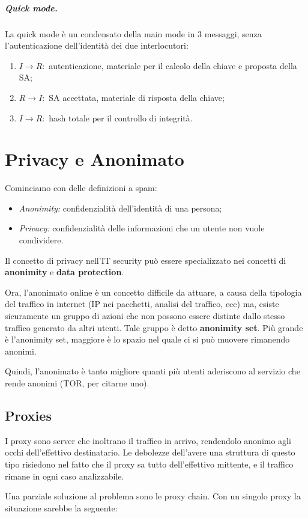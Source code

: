 \documentclass[a4paper, 10pt, twoside]{article}
\begin{document}
	\subparagraph{Quick mode.} La quick mode è un condensato della main mode in 3 messaggi, senza l'autenticazione dell'identità dei due interlocutori:\begin{enumerate}
		\item $I \to R:$ autenticazione, materiale per il calcolo della chiave e proposta della SA;
		\item $R \to I:$ SA accettata, materiale di risposta della chiave;
		\item $I \to R:$ hash totale per il controllo di integrità.
	\end{enumerate}

	\section{Privacy e Anonimato}
	Cominciamo con delle definizioni a spam: \begin{itemize}
		\item \textit{Anonimity:} confidenzialità dell'identità di una persona;
		\item \textit{Privacy:} confidenzialità delle informazioni che un utente non vuole condividere.
	\end{itemize}

	Il concetto di privacy nell'IT security può essere specializzato nei concetti di \textbf{anonimity} e \textbf{data protection}.

	Ora, l'anonimato online è un concetto difficile da attuare, a causa della tipologia del traffico in internet (IP nei pacchetti, analisi del traffico, ecc) ma, esiste sicuramente un gruppo di azioni che non possono essere distinte dallo stesso traffico generato da altri utenti. Tale gruppo è detto \textbf{anonimity set}. Più grande è l'anonimity set, maggiore è lo spazio nel quale ci si può muovere rimanendo anonimi.

	Quindi, l'anonimato è tanto migliore quanti più utenti aderiscono al servizio che rende anonimi (TOR, per citarne uno).

	\subsection{Proxies}
	I proxy sono server che inoltrano il traffico in arrivo, rendendolo anonimo agli occhi dell'effettivo destinatario. Le debolezze dell'avere una struttura di questo tipo risiedono nel fatto che il proxy sa tutto dell'effettivo mittente, e il traffico rimane in ogni caso analizzabile.

	Una parziale soluzione al problema sono le proxy chain. Con un singolo proxy la situazione sarebbe la seguente: 
	
\end{document}

